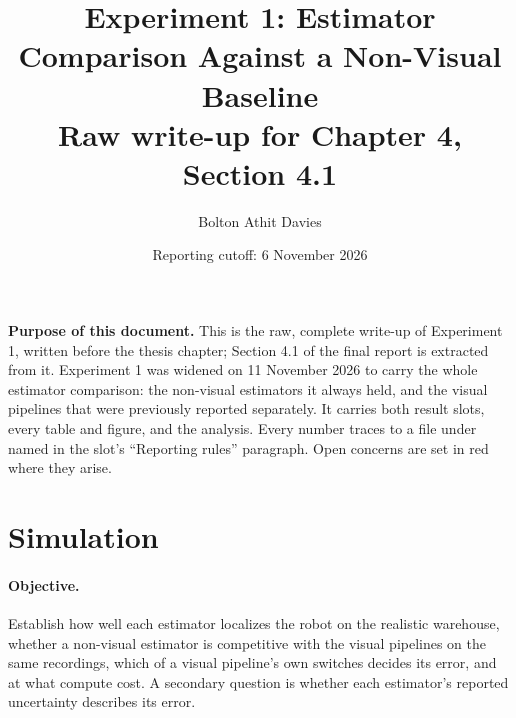 \documentclass[11pt,a4paper,notitlepage]{report}
\title{Experiment 1: Estimator Comparison Against a Non-Visual Baseline\\
       \large Raw write-up for Chapter 4, Section 4.1}
\author{Bolton Athit Davies}
\date{Reporting cutoff: 6 November 2026}
\begin{document}
\maketitle

\noindent\textbf{Purpose of this document.} This is the raw, complete write-up
of Experiment 1, written before the thesis chapter; Section 4.1 of the final
report is extracted from it. Experiment 1 was widened on 11 November 2026 to
carry the whole estimator comparison: the non-visual estimators it always
held, and the visual pipelines that were previously reported separately. It
carries both result slots, every table and figure, and the analysis. Every number traces to a file under 
named in the slot's ``Reporting rules'' paragraph. Open concerns are set in
red where they arise.

\section{Simulation}
\label{sec:exp1-sim}


\paragraph{Objective.} Establish how well each estimator localizes the robot on
the realistic warehouse, whether a non-visual estimator is competitive with the
visual pipelines on the same recordings, which of a visual pipeline's own
switches decides its error, and at what compute cost. A secondary question is
whether each estimator's reported uncertainty describes its error.
\end{document}
